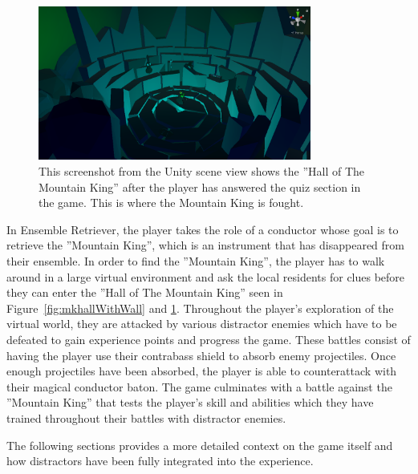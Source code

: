 \begin{figure}[tbph]
    \centering
    \includegraphics[width=0.8\textwidth]{figures/screenshots/HallOfTheMountainKing2KindaLowRes.png}
    \caption[Screenshot of the ''Hall of The Mountain King'' Without the Quiz Wall]{This screenshot from the Unity scene view shows the ''Hall of The Mountain King'' after the player has answered the quiz section in the game. This is where the Mountain King is fought.}
    \label{fig:mkhallWithoutWall}
\end{figure}
In Ensemble Retriever, the player takes the role of a conductor whose goal is to retrieve the ''Mountain King'', which is an instrument that has disappeared from their ensemble. In order to find the ''Mountain King'', the player has to walk around in a large virtual environment and ask the local residents for clues before they can enter the ''Hall of The Mountain King'' seen in Figure~\ref{fig:mkhallWithWall} and \ref{fig:mkhallWithoutWall}. Throughout the player's exploration of the virtual world, they are attacked by various distractor enemies which have to be defeated to gain experience points and progress the game. These battles consist of having the player use their contrabass shield to absorb enemy projectiles. Once enough projectiles have been absorbed, the player is able to counterattack with their magical conductor baton. The game culminates with a battle against the ''Mountain King'' that tests the player's skill and abilities which they have trained throughout their battles with distractor enemies.  

The following sections provides a more detailed context on the game itself and how distractors have been fully integrated into the experience.

